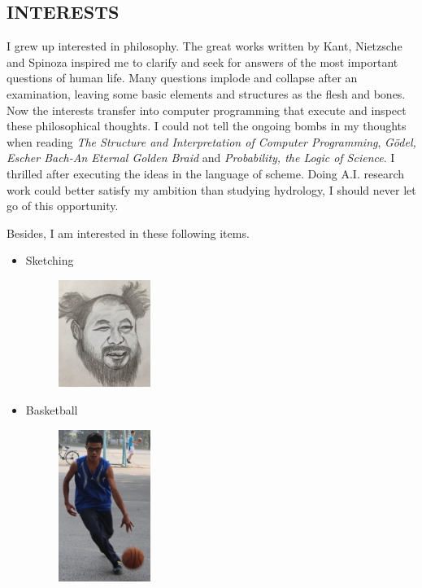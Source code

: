 \documentclass{res}
\begin{document}
\begin{resume}
\section{INTERESTS}
I grew up interested in philosophy. The great works written by Kant, Nietzsche and Spinoza inspired me to clarify and seek for answers of the most important questions of human life. Many questions implode and collapse after an examination, leaving some basic elements and structures as the flesh and bones. Now the interests transfer into computer programming that execute and inspect these philosophical thoughts. I could not tell the ongoing bombs in my thoughts when reading \emph{The Structure and Interpretation of Computer Programming}, \emph{
G{\"o}del, Escher Bach-An Eternal Golden Braid} and \emph{Probability, the Logic of Science}. I thrilled after executing the ideas in the language of scheme. Doing A.I. research work could better satisfy my ambition than studying hydrology, I should never let go of this opportunity. 

Besides, I am interested in these following items.
\begin{itemize}
\item Sketching
\begin{figure} [H]
\centering
 \includegraphics[width=3cm]{sketching.png}
\end{figure}
\item Basketball
\begin{figure} [H]
\centering
 \includegraphics[width=3cm]{basketball.png}
\end{figure}
\end{itemize}



\end{resume}
\end{document}
